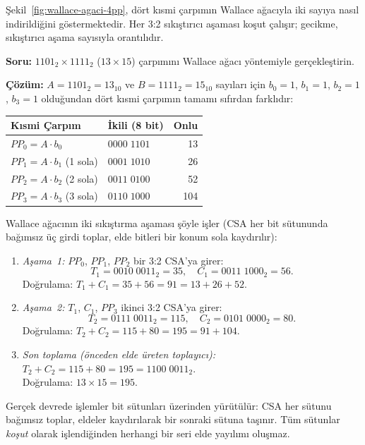 Şekil~\ref{fig:wallace-agaci-4pp}, dört kısmi çarpımın Wallace ağacıyla iki sayıya nasıl indirildiğini göstermektedir. Her 3:2 sıkıştırıcı aşaması koşut çalışır; gecikme, sıkıştırıcı aşama sayısıyla orantılıdır.

\begin{ornek}[5.9]
\textbf{Soru:} $1101_2 \times 1111_2$ ($13 \times 15$) çarpımını Wallace ağacı yöntemiyle gerçekleştirin.

\textbf{Çözüm:} $A = 1101_2 = 13_{10}$ ve $B = 1111_2 = 15_{10}$ sayıları için $b_0{=}1$, $b_1{=}1$, $b_2{=}1$, $b_3{=}1$ olduğundan dört kısmi çarpımın tamamı sıfırdan farklıdır:

\begin{center}
\begin{tabular}{l l r}
\toprule
\textbf{Kısmi Çarpım} & \textbf{İkili (8 bit)} & \textbf{Onlu} \\
\midrule
$PP_0 = A \cdot b_0$           & $0000\;1101$ & 13  \\
$PP_1 = A \cdot b_1$ (1 sola)  & $0001\;1010$ & 26  \\
$PP_2 = A \cdot b_2$ (2 sola)  & $0011\;0100$ & 52  \\
$PP_3 = A \cdot b_3$ (3 sola)  & $0110\;1000$ & 104 \\
\bottomrule
\end{tabular}
\end{center}

Wallace ağacının iki sıkıştırma aşaması şöyle işler (CSA her bit sütununda bağımsız üç girdi toplar, elde bitleri bir konum sola kaydırılır):

\begin{enumerate}[nosep]
    \item \textit{Aşama~1:} $PP_0$, $PP_1$, $PP_2$ bir 3:2 CSA'ya girer:
        \[ T_1 = 0010\;0011_2 = 35, \quad C_1 = 0011\;1000_2 = 56. \]
        Doğrulama: $T_1 + C_1 = 35 + 56 = 91 = 13 + 26 + 52$. \checkmark
    \item \textit{Aşama~2:} $T_1$, $C_1$, $PP_3$ ikinci 3:2 CSA'ya girer:
        \[ T_2 = 0111\;0011_2 = 115, \quad C_2 = 0101\;0000_2 = 80. \]
        Doğrulama: $T_2 + C_2 = 115 + 80 = 195 = 91 + 104$. \checkmark
    \item \textit{Son toplama (önceden elde üreten toplayıcı):} $T_2 + C_2 = 115 + 80 = 195 = 1100\;0011_2$. \\
        Doğrulama: $13 \times 15 = 195$. \checkmark
\end{enumerate}

Gerçek devrede işlemler bit sütunları üzerinden yürütülür: CSA her sütunu bağımsız toplar, eldeler kaydırılarak bir sonraki sütuna taşınır. Tüm sütunlar \emph{koşut} olarak işlendiğinden herhangi bir seri elde yayılımı oluşmaz.
\end{ornek}

